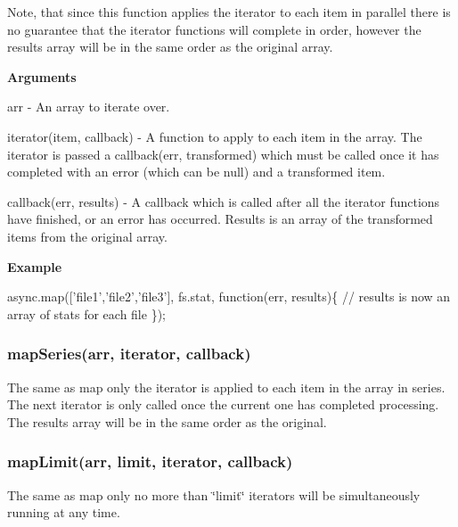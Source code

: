 Note, that since this function applies the iterator to each item in parallel there is no guarantee that the iterator functions will complete in order, however the results array will be in the same order as the original array.

{\bfseries Arguments}


\begin{DoxyItemize}
\item arr -\/ An array to iterate over.
\item iterator(item, callback) -\/ A function to apply to each item in the array. The iterator is passed a callback(err, transformed) which must be called once it has completed with an error (which can be null) and a transformed item.
\item callback(err, results) -\/ A callback which is called after all the iterator functions have finished, or an error has occurred. Results is an array of the transformed items from the original array.
\end{DoxyItemize}

{\bfseries Example}


\begin{DoxyCode}
async.map([\textcolor{stringliteral}{'file1'},\textcolor{stringliteral}{'file2'},\textcolor{stringliteral}{'file3'}], fs.stat, \textcolor{keyword}{function}(err, results)\{
    \textcolor{comment}{// results is now an array of stats for each file}
\});
\end{DoxyCode}
 



\label{_mapSeries}%
 \subsubsection*{map\+Series(arr, iterator, callback)}

The same as map only the iterator is applied to each item in the array in series. The next iterator is only called once the current one has completed processing. The results array will be in the same order as the original.





\label{_mapLimit}%
 \subsubsection*{map\+Limit(arr, limit, iterator, callback)}

The same as map only no more than \char`\"{}limit\char`\"{} iterators will be simultaneously running at any time.

